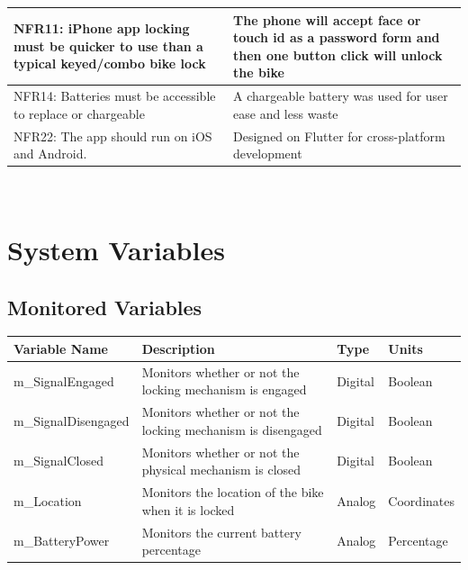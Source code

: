 \documentclass[12pt, titlepage]{article}
\begin{document}
\begin{minipage}{\textwidth}
\begin{tabular}{| p{} | p{} | }
 \hline
NFR11: iPhone app locking must be quicker to use than a typical keyed/combo bike lock &The phone will accept face or touch id as a password form and then one button click will unlock the bike \\
 \hline
NFR14: Batteries must be accessible to replace or chargeable&A chargeable battery was used for user ease and less waste\\
 \hline
NFR22: The app should run on iOS and Android.&Designed on Flutter for cross-platform development\\
 \hline
\end{tabular}
\end{minipage}\\



\newpage
\section{System Variables}


\subsection{Monitored Variables}

\begin{minipage}{\textwidth}
\renewcommand*{\arraystretch}{1.5}
\begin{tabular}{| p{} | p{} | p{} | p{} |}
 \hline
 Variable Name & Description & Type & Units \\ 
 \hline
 m\_SignalEngaged & Monitors whether or not the locking mechanism is engaged & Digital & Boolean \\ 
  \hline
 m\_SignalDisengaged & Monitors whether or not the locking mechanism is disengaged & Digital & Boolean \\ 
  \hline
 m\_SignalClosed& Monitors whether or not the physical mechanism is closed & Digital & Boolean \\ 
  \hline
 m\_Location & Monitors the location of the bike when it is locked & Analog & Coordinates \\ 
  \hline
 m\_BatteryPower & Monitors the current battery percentage & Analog & Percentage \\ 
 \hline
\end{tabular}
\end{minipage}\\
\end{document}
